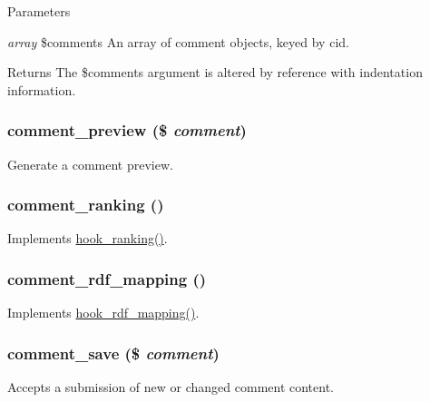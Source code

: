 \begin{DoxyParams}{Parameters}
\item[{\em array}]\$comments An array of comment objects, keyed by cid. \end{DoxyParams}
\begin{DoxyReturn}{Returns}
The \$comments argument is altered by reference with indentation information. 
\end{DoxyReturn}
\hypertarget{comment_8module_a032c5623dc97e32faf726eeea5618a36}{
\subsubsection[{comment\_\-preview}]{\setlength{\rightskip}{0pt plus 5cm}comment\_\-preview (\$ {\em comment})}}
\label{comment_8module_a032c5623dc97e32faf726eeea5618a36}
Generate a comment preview. \hypertarget{comment_8module_a7599b61c6ed28e6424dc51f9311539c5}{
\subsubsection[{comment\_\-ranking}]{\setlength{\rightskip}{0pt plus 5cm}comment\_\-ranking ()}}
\label{comment_8module_a7599b61c6ed28e6424dc51f9311539c5}
Implements \hyperlink{group__node__api__hooks_gaf7a28ce3230dc96833ea5338fd26f43c}{hook\_\-ranking()}. \hypertarget{comment_8module_a7a0a7125c95b61cea16f18f800880cf2}{
\subsubsection[{comment\_\-rdf\_\-mapping}]{\setlength{\rightskip}{0pt plus 5cm}comment\_\-rdf\_\-mapping ()}}
\label{comment_8module_a7a0a7125c95b61cea16f18f800880cf2}
Implements \hyperlink{group__rdf_gae3e7f047bdcb9309b323e2af09966765}{hook\_\-rdf\_\-mapping()}. \hypertarget{comment_8module_a4ef5d3d2161511e0d09a560fb5004e82}{
\subsubsection[{comment\_\-save}]{\setlength{\rightskip}{0pt plus 5cm}comment\_\-save (\$ {\em comment})}}
\label{comment_8module_a4ef5d3d2161511e0d09a560fb5004e82}
Accepts a submission of new or changed comment content.


